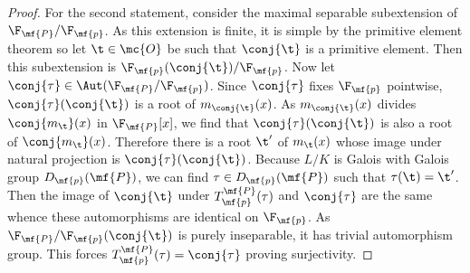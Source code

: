 \documentclass[12pt]{article}
\begin{document}
\begin{proof}
        For the second statement, consider the maximal separable subextension of \(\F_{\mf{P}}/\F_{\mf{p}}\). As this extension is finite, it is simple by the primitive element theorem so let \(\t \in \mc{O}\) be such that \(\conj{\t}\) is a primitive element. Then this subextension is \(\F_{\mf{p}}(\conj{\t})/\F_{\mf{p}}\). Now let \(\conj{\tau} \in \Aut(\F_{\mf{P}}/\F_{\mf{p}})\). Since \(\conj{\tau}\) fixes \(\F_{\mf{p}}\) pointwise, \(\conj{\tau}(\conj{\t})\) is a root of \(m_{\conj{\t}}(x)\). As \(m_{\conj{\t}}(x)\) divides \(\conj{m_{\t}}(x)\) in \(\F_{\mf{P}}[x]\), we find that \(\conj{\tau}(\conj{\t})\) is also a root of \(\conj{m_{\t}}(x)\). Therefore there is a root \(\t'\) of \(m_{\t}(x)\) whose image under natural projection is \(\conj{\tau}(\conj{\t})\). Because \(L/K\) is Galois with Galois group \(D_{\mf{p}}(\mf{P})\), we can find \(\tau \in D_{\mf{p}}(\mf{P})\) such that \(\tau(\t) = \t'\). Then the image of \(\conj{\t}\) under \(T_{\mf{p}}^{\mf{P}}(\tau)\) and \(\conj{\tau}\) are the same whence these automorphisms are identical on \(\F_{\mf{p}}\). As \(\F_{\mf{P}}/\F_{\mf{p}}(\conj{\t})\) is purely inseparable, it has trivial automorphism group. This forces \(T_{\mf{p}}^{\mf{P}}(\tau) = \conj{\tau}\) proving surjectivity.
      \end{proof}
\end{document}
